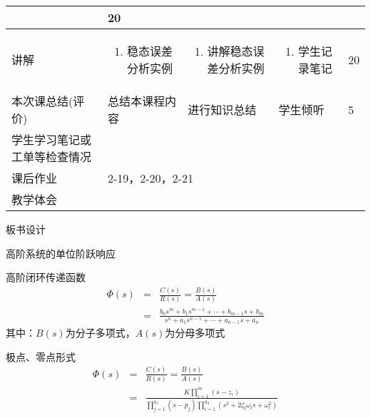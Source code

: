 {\begin{landscape}
\begin{longtable}{|m{10mm}|m{50mm}|m{50mm}|m{50mm}|m{15mm}|}
\begin{enumerate}
\end{enumerate} &20 \\\hline
讲解&\begin{enumerate}
\item 稳态误差分析实例
\end{enumerate}
 &\begin{enumerate}
\item 讲解稳态误差分析实例
\end{enumerate} &\begin{enumerate}
\item 学生记录笔记
\end{enumerate} &20 \\\hline

\centering 本次课总结(评价)&总结本课程内容 &进行知识总结 &学生倾听 &5 \\\hline
\centering 学生学习笔记或工单等检查情况&\multicolumn{4}{m{165mm}|}{\quad}\\\hline
\centering 课后作业&\multicolumn{4}{m{165mm}|}{2-19，2-20，2-21}\\\hline
\centering 教学体会&\multicolumn{4}{m{165mm}|}{\quad}\\
\end{longtable}

\end{landscape}
\clearpage
\begin{center}
{\huge 板书设计}
\end{center}
}
 \begin{frame}{高阶系统的单位阶跃响应}
 \begin{block}{高阶闭环传递函数}
 \begin{eqnarray*}
 \Phi(s)&=&\frac{C(s)}{R(s)}=\frac{B(s)}{A(s)}\\
 &=&\frac{b_0s^m+b_1s^{m-1}+\cdots +b_{m-1}s+b_m}{s^n+a_1s^{n-1}+\cdots +a_{n-1}s+a_n}
 \end{eqnarray*}
 其中：$B(s)$为分子多项式，$A(s)$为分母多项式
 \end{block}
 \end{frame}
 
 \begin{frame}
 \begin{block}{极点、零点形式}
 \begin{eqnarray*}
 \Phi(s)&=&\frac{C(s)}{R(s)}=\frac{B(s)}{A(s)}\\
&=&\frac{K\prod\limits_{i=1}^m(s-z_i)}{\prod\limits_{j=1}^{n_1}(s-p_j)\prod\limits_{i=1}^{n_2}(s^2+2\zeta_l\omega_ls+\omega_l^2)}
\end{eqnarray*}  
\end{block}
\end{frame}

